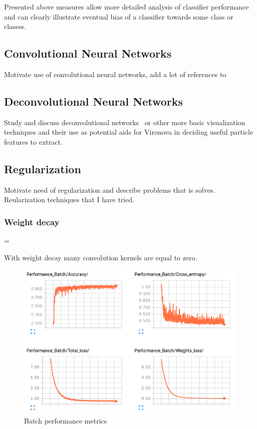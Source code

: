 \documentclass[a4paper, 11pt, table]{article}
\newenvironment{warning}
  {\par\begin{mdframed}[linewidth=2pt,linecolor=red]%
    \begin{list}{}{\leftmargin=1cm
                   \labelwidth=\leftmargin}\item[\Large\ding{43}]}
  {\end{list}\end{mdframed}\par}
\begin{document}
Presented above measures allow more detailed analysis of classifier performance and can clearly illustrate eventual bias of a classifier towards some class or classes. 

\subsection{Convolutional Neural Networks}
Motivate use of convolutional neural networks, add a lot of references to~\cite{dl_book}

\subsection{Deconvolutional Neural Networks}
Study and discuss deconvolutional networks~\cite{DBLP:journals/corr/ZeilerF13} or other more basic visualization techniques and their use as potential aids for Vironova in deciding useful particle features to extract.

\subsection{Regularization}

Motivate need of regularization and describe problems that is solves. 
Reularization techniques that I have tried.

\subsubsection{Weight decay}

\begin{warning}
With weight decay many convolution kernels are equal to zero. 
\end{warning}

\begin{figure}[H]
\centering
\includegraphics[scale=0.5]{weight_decay/performance.png}
\caption{Batch performance metrics}
\end{figure}
\end{document}
